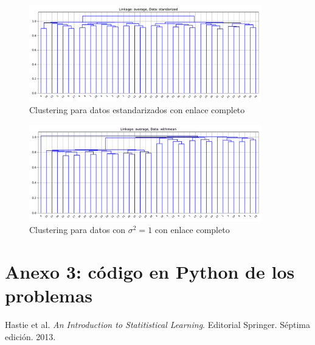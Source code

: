 \documentclass[11pt]{article}
\begin{document}
\begin{figure}[H]
    \centering
    \includegraphics[width = 0.90\textwidth]{4-averagestandarized.pdf}
    \caption{Clustering para datos estandarizados con enlace completo}
    \label{4-averagestandarized}
\end{figure}
\begin{figure}[H]
    \centering
    \includegraphics[width = 0.90\textwidth]{4-averagewithmean.pdf}
    \caption{Clustering para datos con $\sigma^2 = 1$ con enlace completo}
    \label{4-averagewithmean}
\end{figure}

\pagebreak
\section*{Anexo 3: código en Python de los problemas}

\begin{thebibliography}{9}
     Hastie et al. \textit{An Introduction to Statitistical Learning}. Editorial Springer.  Séptima edición. 2013.
\end{thebibliography}
\end{document}
